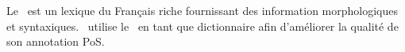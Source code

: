 \documentclass[manual-fr.tex]{subfiles}
\begin{document}
Le \LeFFFFullCite\ est un lexique du Français riche fournissant des information morphologiques et syntaxiques. \SEM\ utilise le \LeFFF\ en tant que
dictionnaire afin d'améliorer la qualité de son annotation PoS.
\end{document}
